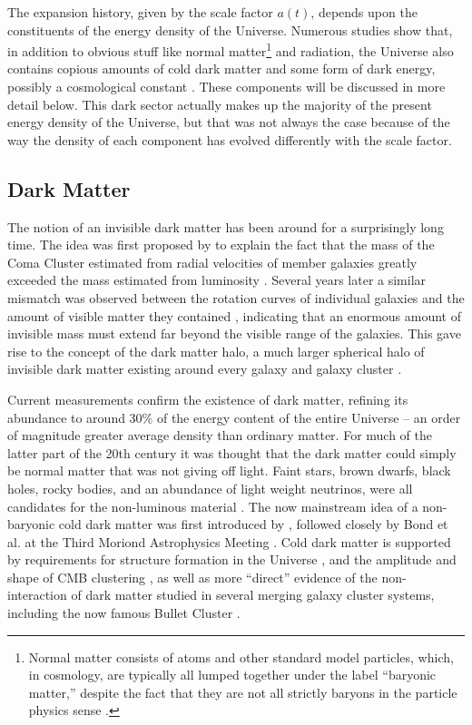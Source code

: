 The expansion history, given by the scale factor $a(t)$, depends upon the constituents of the energy density of the Universe. Numerous studies show that, in addition to obvious stuff like normal matter\footnote{Normal matter consists of atoms and other standard model particles, which, in cosmology, are typically all lumped together under the label ``baryonic matter,'' despite the fact that they are not all strictly baryons in the particle physics sense \citep{Roos10}.} and radiation, the Universe also contains copious amounts of cold dark matter and some form of dark energy, possibly a cosmological constant \citep[e.g.][]{DodelsonText}. These components will be discussed in more detail below. This dark sector actually makes up the majority of the present energy density of the Universe, but that was not always the case because of the way the density of each component has evolved differently with the scale factor.

\subsection{Dark Matter}
\label{sec:DM}

The notion of an invisible dark matter has been around for a surprisingly long time. The idea was first proposed by \citet{Zwicky33} to explain the fact that the mass of the Coma Cluster estimated from radial velocities of member galaxies greatly exceeded the mass estimated from luminosity \citep[see also][]{Zwicky37}. Several years later a similar mismatch was observed between the rotation curves of individual galaxies and the amount of visible matter they contained \citep{Babcock39}, indicating that an enormous amount of invisible mass must extend far beyond the visible range of the galaxies. This gave rise to the concept of the dark matter halo, a much larger spherical halo of invisible dark matter existing around every galaxy and galaxy cluster \citep[see][for a review of dark matter's discovery]{Bergh99}.

Current measurements confirm the existence of dark matter, refining its abundance to around 30\% of the energy content of the entire Universe -- an order of magnitude greater average density than ordinary matter. For much of the latter part of the 20th century it was thought that the dark matter could simply be normal matter that was not giving off light. Faint stars, brown dwarfs, black holes, rocky bodies, and an abundance of light weight neutrinos, were all candidates for the non-luminous material \citep{Bergh99}. The now mainstream idea of a non-baryonic cold dark matter was first introduced by \citet{Peebles82}, followed closely by Bond et al. at the Third Moriond Astrophysics Meeting \citep{Bond83}. Cold dark matter is supported by requirements for structure formation in the Universe \citep{Peebles82}, and the amplitude and shape of \ac{CMB} clustering \citep{White95}, as well as more ``direct'' evidence of the non-interaction of dark matter studied in several merging galaxy cluster systems, including the now famous Bullet Cluster \citep[][see also \autoref{sec:ClusterAstro}]{Clowe06}.

